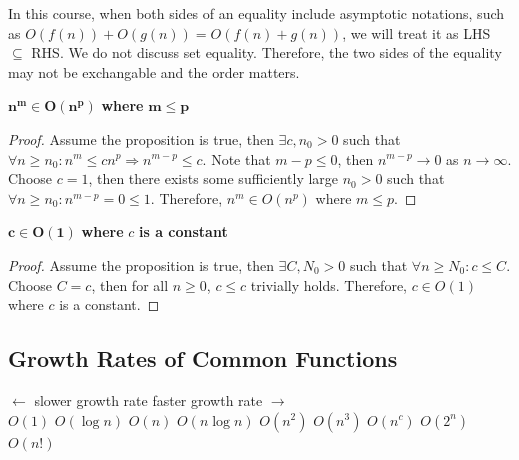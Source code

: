 \begin{remark}
    In this course, when both sides of an equality include asymptotic notations, such as $O(f(n)) + O(g(n)) = O(f(n) + g(n))$, we will treat it as LHS $\subseteq$ RHS.
    We do not discuss set equality.
    Therefore, the two sides of the equality may not be exchangable and the order matters.
\end{remark}

\begin{proposition}
    $\bm{n^m\in O(n^p)}$\textbf{ where }$\bm{m\leq p}$
\end{proposition}
\begin{proof}
    Assume the proposition is true, then $\exists c, n_0 > 0$ such that $\forall n\geq n_0 : n^m \leq cn^p \Rightarrow n^{m-p} \leq c$.
    Note that $m-p\leq 0$, then $n^{m-p}\to 0$ as $n\to\infty$.
    Choose $c=1$, then there exists some sufficiently large $n_0 > 0$ such that $\forall n\geq n_0 : n^{m-p} = 0 \leq 1$.
    Therefore, $n^m\in O(n^p)$ where $m\leq p$.
\end{proof}

\begin{proposition}
    $\bm{c\in O(1)}$ \textbf{where} $c$ \textbf{is a constant}
\end{proposition}
\begin{proof}
    Assume the proposition is true, then $\exists C, N_0 > 0$ such that $\forall n\geq N_0 : c \leq C$.
    Choose $C=c$, then for all $n\geq 0$, $c \leq c$ trivially holds.
    Therefore, $c\in O(1)$ where $c$ is a constant.
\end{proof}

\subsection{Growth Rates of Common Functions} \phantom{.}

\begin{theorem}\label{thm:growth-rates-of-common-functions}
    $\leftarrow$ slower growth rate \dotfill faster growth rate $\rightarrow$ \\
    \hfill $O(1)$ \hfill $O(\log n)$ \hfill $O(n)$ \hfill $O(n\log n)$ \hfill $O(n^2)$ \hfill $O(n^3)$ \hfill $O(n^c)$ \hfill $O(2^n)$ \hfill $O(n!)$
\end{theorem}